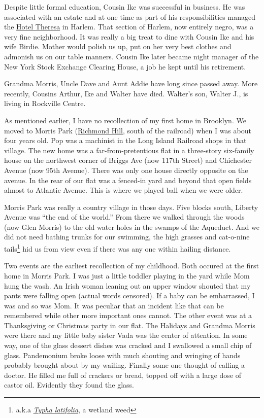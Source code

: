 \documentclass[12pt]{book}              %
\begin{document}
Despite little formal education, Cousin Ike was successful in business. He was associated with an estate and at one time as part of his responsibilities managed the \href{http://en.wikipedia.org/wiki/Hotel_Theresa}{Hotel Theresa} in Harlem. That section of Harlem, now entirely negro, was a very fine neighborhood. It was really a big treat to dine with Cousin Ike and his wife Birdie. Mother would polish us up, put on her very best clothes and admonish us on our table manners. Cousin Ike later became night manager of the New York Stock Exchange Clearing House, a job he kept until his retirement. 

Grandma Morris, Uncle Dave and Aunt Addie have long since passed away. More recently, Cousins Arthur, Ike and Walter have died. Walter's son, Walter J., is living in Rockville Centre. 

As mentioned earlier, I have no recollection of my first home in Brooklyn. We moved to Morris Park (\href{http://en.wikipedia.org/wiki/Richmond_Hill,_Queens}{Richmond Hill}, south of the railroad) when I was about four years old. Pop was a machinist in the Long Island Railroad shops in that village. The new home was a far-from-pretentious flat in a three-story six-family house on the northwest corner of Briggs Ave (now 117th Street) and Chichester Avenue (now 95th Avenue). There was only one house directly opposite on the avenue. In the rear of our flat was a fenced-in yard and beyond that open fields almost to Atlantic Avenue. This is where we played ball when we were older. 

Morris Park was really a country village in those days. Five blocks south, Liberty Avenue was ``the end of the world.'' From there we walked through the woods (now Glen Morris) to the old water holes in the swamps of the Aqueduct. And we did not need bathing trunks for our swimming, the high grasses and cat-o-nine tails\footnote{a.k.a \href{http://en.wikipedia.org/wiki/Typha_latifolia}{\it Typha latifolia}, a wetland weed} hid us from view even if there was any one within hailing distance. 

Two events are the earliest recollection of my childhood. Both occured at the first home in Morris Park. I was just a little toddler playing in the yard while Mom hung the wash. An Irish woman leaning out an upper window shouted that my pants were falling open (actual words censored). If a baby can be embarrassed, I was and so was Mom. It was peculiar that an incident like that can be remembered while other more important ones cannot. The other event was at a Thanksgiving or Christmas party in our flat. The Halidays and Grandma Morris were there and my little baby sister Vada was the center of attention. In some way, one of the glass dessert dishes was cracked and I swallowed a small chip of glass. Pandemonium broke loose with much shouting and wringing of hands probably brought about by my wailing. Finally some one thought of calling a doctor. He filled me full of crackers or bread, topped off with a large dose of castor oil. Evidently they found the glass. 
\end{document}
